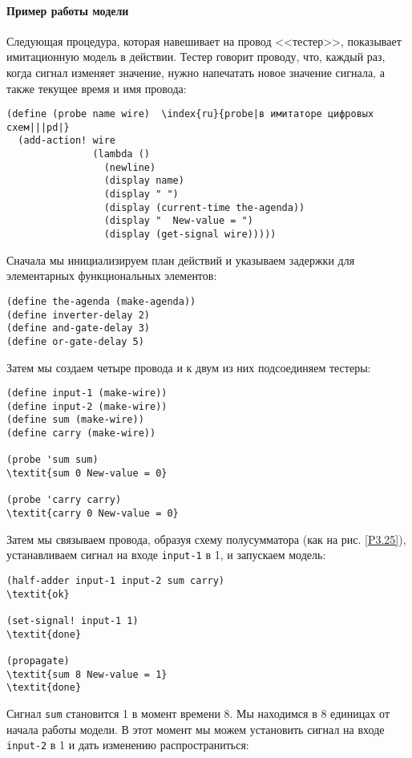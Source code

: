\paragraph{Пример работы модели}


Следующая процедура, которая навешивает на провод
<<тестер>>, показывает  имитационную модель в действии.  Тестер говорит
проводу, что, каждый раз, когда сигнал изменяет значение, нужно
напечатать новое значение сигнала, а также текущее время и имя
провода:

\begin{Verbatim}[fontsize=\small]
(define (probe name wire)  \index{ru}{probe|в имитаторе цифровых схем|||pd|}
  (add-action! wire
               (lambda ()
                 (newline)
                 (display name)
                 (display " ")
                 (display (current-time the-agenda))
                 (display "  New-value = ")
                 (display (get-signal wire)))))
\end{Verbatim}

Сначала мы инициализируем план действий и указываем
задержки для элементарных функциональных элементов:

\begin{Verbatim}[fontsize=\small]
(define the-agenda (make-agenda))
(define inverter-delay 2)
(define and-gate-delay 3)
(define or-gate-delay 5)
\end{Verbatim}
Затем мы создаем четыре провода и к двум из них подсоединяем тестеры:

\begin{Verbatim}[fontsize=\small]
(define input-1 (make-wire))
(define input-2 (make-wire))
(define sum (make-wire))
(define carry (make-wire))

(probe 'sum sum)
\textit{sum 0 New-value = 0}

(probe 'carry carry)
\textit{carry 0 New-value = 0}
\end{Verbatim}
Затем мы связываем провода, образуя схему полусумматора (как на
рис. \ref{P3.25}), устанавливаем сигнал на входе
{\tt input-1} в 1, и запускаем модель:

\begin{Verbatim}[fontsize=\small]
(half-adder input-1 input-2 sum carry)
\textit{ok}

(set-signal! input-1 1)
\textit{done}

(propagate)
\textit{sum 8 New-value = 1}
\textit{done}
\end{Verbatim}
Сигнал {\tt sum} становится 1 в момент времени 8.  Мы находимся
в 8 единицах от начала работы модели.  В этот момент мы можем
установить сигнал на входе {\tt input-2} в 1 и дать изменению
распространиться:

